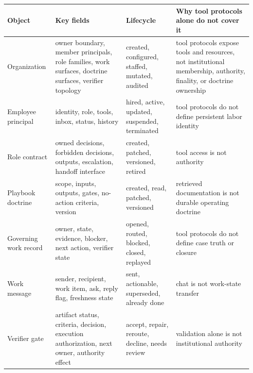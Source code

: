 \documentclass[
]{article}
\newcounter{none} %
\begin{document}
{\def\LTcaptype{none} %
\begin{longtable}[]{@{}
  >{\raggedright\arraybackslash}p{}
  >{\raggedright\arraybackslash}p{}
  >{\raggedright\arraybackslash}p{}
  >{\raggedright\arraybackslash}p{}@{}}
\toprule\noalign{}
\begin{minipage}[b]{\linewidth}\raggedright
Object
\end{minipage} & \begin{minipage}[b]{\linewidth}\raggedright
Key fields
\end{minipage} & \begin{minipage}[b]{\linewidth}\raggedright
Lifecycle
\end{minipage} & \begin{minipage}[b]{\linewidth}\raggedright
Why tool protocols alone do not cover it
\end{minipage} \\
\midrule\noalign{}
\endhead
\bottomrule\noalign{}
\endlastfoot
Organization & owner boundary, member principals, role families, work surfaces, doctrine surfaces, verifier topology & created, configured, staffed, mutated, audited & tool protocols expose tools and resources, not institutional membership, authority, finality, or doctrine ownership \\
Employee principal & identity, role, tools, inbox, status, history & hired, active, updated, suspended, terminated & tool protocols do not define persistent labor identity \\
Role contract & owned decisions, forbidden decisions, outputs, escalation, handoff interface & created, patched, versioned, retired & tool access is not authority \\
Playbook doctrine & scope, inputs, outputs, gates, no-action criteria, version & created, read, patched, versioned & retrieved documentation is not durable operating doctrine \\
Governing work record & owner, state, evidence, blocker, next action, verifier state & opened, routed, blocked, closed, replayed & tool protocols do not define case truth or closure \\
Work message & sender, recipient, work item, ask, reply flag, freshness state & sent, actionable, superseded, already done & chat is not work-state transfer \\
Verifier gate & artifact status, criteria, decision, execution authorization, next owner, authority effect & accept, repair, reroute, decline, needs review & validation alone is not institutional authority \\

\end{longtable}}
\end{document}
